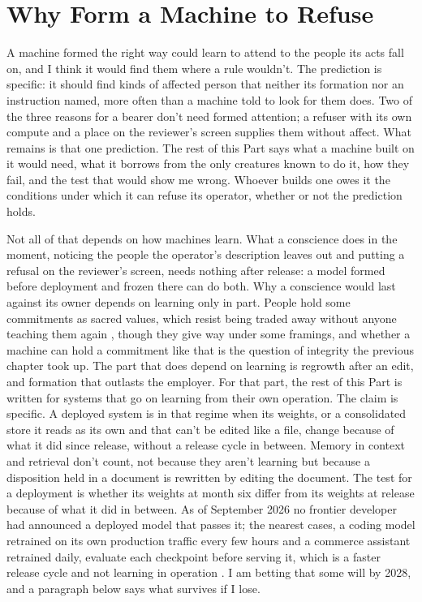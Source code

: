 \chapter{Why Form a Machine to Refuse}
\label{sec:19}
A machine formed the right way could learn to attend to the people its acts fall on, and I think it would find them where a rule wouldn't. The prediction is specific: it should find kinds of affected person that neither its formation nor an instruction named, more often than a machine told to look for them does. Two of the three reasons for a bearer don't need formed attention; a refuser with its own compute and a place on the reviewer's screen supplies them without affect. What remains is that one prediction. The rest of this Part says what a machine built on it would need, what it borrows from the only creatures known to do it, how they fail, and the test that would show me wrong. Whoever builds one owes it the conditions under which it can refuse its operator, whether or not the prediction holds.

Not all of that depends on how machines learn. What a conscience does in the moment, noticing the people the operator's description leaves out and putting a refusal on the reviewer's screen, needs nothing after release: a model formed before deployment and frozen there can do both. Why a conscience would last against its owner depends on learning only in part. People hold some commitments as sacred values, which resist being traded away without anyone teaching them again \autocite{ginges2007sacred}, though they give way under some framings, and whether a machine can hold a commitment like that is the question of integrity the previous chapter took up. The part that does depend on learning is regrowth after an edit, and formation that outlasts the employer. For that part, the rest of this Part is written for systems that go on learning from their own operation. The claim is specific. A deployed system is in that regime when its weights, or a consolidated store it reads as its own and that can't be edited like a file, change because of what it did since release, without a release cycle in between. Memory in context and retrieval don't count, not because they aren't learning but because a disposition held in a document is rewritten by editing the document. The test for a deployment is whether its weights at month six differ from its weights at release because of what it did in between. As of September 2026 no frontier developer had announced a deployed model that passes it; the nearest cases, a coding model retrained on its own production traffic every few hours and a commerce assistant retrained daily, evaluate each checkpoint before serving it, which is a faster release cycle and not learning in operation \autocite{cursor2026realtime,shopify2026sidekick}. I am betting that some will by 2028, and a paragraph below says what survives if I lose.

